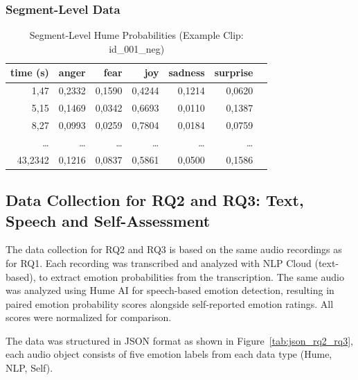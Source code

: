 \subsubsection{Segment-Level Data}
\begin{table}[H]
    \centering
    
    \begin{tabular}{rrrrrrl}
      \toprule
      \textbf{time (s)} & \textbf{anger} & \textbf{fear} & \textbf{joy} & \textbf{sadness} & \textbf{surprise} \\
      \midrule
      1,47    & 0,2332  & 0,1590 & 0,4244 & 0,1214 & 0,0620 \\
      5,15    & 0,1469  & 0,0342 & 0,6693 & 0,0110 & 0,1387 \\
      8,27    & 0,0993  & 0,0259 & 0,7804 & 0,0184 & 0,0759 \\
      \dots   & \dots   & \dots  & \dots  & \dots  & \dots  \\
      43,2342 & 0,1216  & 0,0837 & 0,5861 & 0,0500 & 0,1586 \\
      \bottomrule
    \end{tabular}
    \caption{Segment‐Level Hume Probabilities (Example Clip: id\_001\_neg)}
    \label{tab:segments_hume_example}
  \end{table}
  

\subsection{Data Collection for RQ2 and RQ3: Text, Speech and Self-Assessment}
\label{sec:datacoll_rq2_rq3}


The data collection for RQ2 and RQ3 is based on the same audio recordings as for RQ1. 
Each recording was transcribed and analyzed with NLP Cloud (text-based), to extract emotion probabilities from the transcription. The same audio was analyzed using Hume AI for speech-based emotion detection, resulting in paired emotion probability scores alongside self-reported emotion ratings. All scores were normalized for comparison.

The data was structured in JSON format as shown in Figure~\ref{tab:json_rq2_rq3}, each audio object consists of five emotion labels from each data type (Hume, NLP, Self). 

